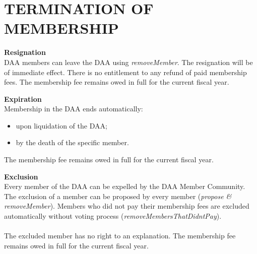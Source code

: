 \section{TERMINATION OF MEMBERSHIP}\label{sec:termination-of-membership}

\item \textbf{Resignation} \\
DAA members can leave the DAA using \emph{removeMember}.
The resignation will be of immediate effect.
There is no entitlement to any refund of paid membership fees.
The membership fee remains owed in full for the current fiscal year.

\item \textbf{Expiration} \\
Membership in the DAA ends automatically:
\begin{itemize}
    \item upon liquidation of the DAA;
    \item by the death of the specific member.
\end{itemize}
The membership fee remains owed in full for the current fiscal year.

\item \textbf{Exclusion} \\
Every member of the DAA can be expelled by the DAA Member Community.
The exclusion of a member can be proposed by every member (\emph{propose \& removeMember}).
Members who did not pay their membership fees are excluded automatically without voting process (\emph{removeMembersThatDidntPay}). \\ \\
The excluded member has no right to an explanation.
The membership fee remains owed in full for the current fiscal year.
